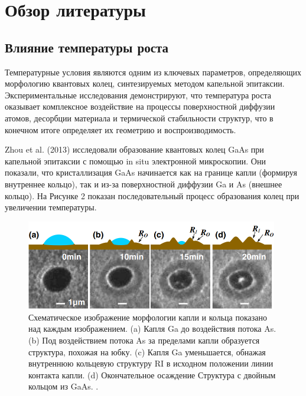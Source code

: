 \documentclass[14pt,oneside]{extarticle}
\begin{document}
\pagebreak
\section{Обзор литературы}

\subsection{Влияние температуры роста}

Температурные условия являются одним из ключевых параметров, определяющих морфологию квантовых колец, синтезируемых методом капельной эпитаксии. Экспериментальные исследования демонстрируют, что температура роста оказывает комплексное воздействие на процессы поверхностной диффузии атомов, десорбции материала и термической стабильности структур, что в конечном итоге определяет их геометрию и воспроизводимость.

Zhou et al. (2013) исследовали образование квантовых колец GaAs при капельной эпитаксии с помощью in situ электронной микроскопии. Они показали, что кристаллизация GaAs начинается как на границе капли (формируя внутреннее кольцо), так и из-за поверхностной диффузии Ga и As (внешнее кольцо). На Рисунке 2 показан последовательный процесс образования колец при увеличении температуры.

\begin{figure}
\begin{center}
        \includegraphics[width=11cm]{images/Zhou1-Firgure1.png}
        \caption{\label{fig:Zhou1-1}
            Схематическое изображение морфологии капли и кольца показано над каждым изображением. (a) Капля Ga до воздействия потока As. (b) Под воздействием потока As за пределами капли образуется структура, похожая на юбку. (c) Капля Ga уменьшается, обнажая внутреннюю кольцевую структуру RI в исходном положении линии контакта капли. (d) Окончательное осаждение Структура с двойным кольцом из GaAs. \cite{Zhou1}.}
\end{center}
\end{figure}
\end{document}
